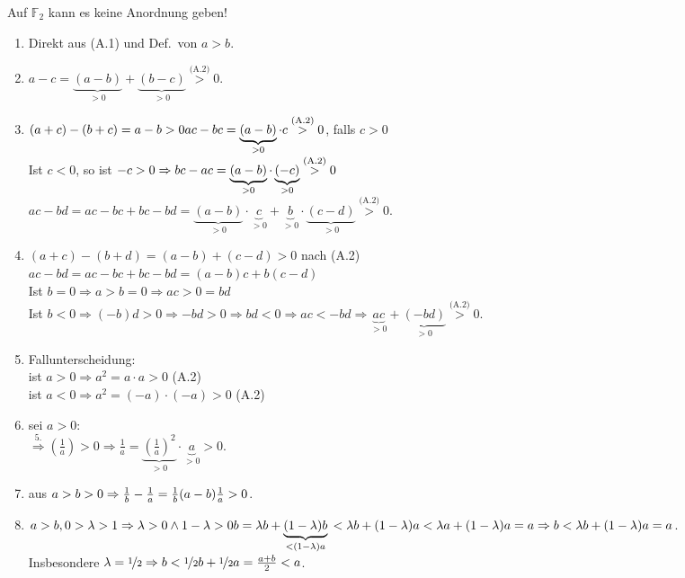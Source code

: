 \documentclass[../ana1.tex]{subfiles}
\begin{document}
\begin{bem}
	Auf \(\mathbb{F}_2\) kann es keine Anordnung geben!
\end{bem}
\begin{bew}
	\begin{enumerate}\leavevmode %
		\item Direkt aus (A.1) und Def.\ von \(a>b\).
		\item \(a-c = \underbrace{(a-b)}_{>0}+\underbrace{(b-c)}_{>0} \overset{\text{(A.2)}}{>} 0\).
		\item \((a+c)-(b+c)=a-b>0\\
			ac-bc=\underbrace{(a-b)}_{>0}\cdot c \overset{\text{(A.2)}}{>}0\), falls \(c>0\) \\
			Ist \(c<0\), so ist \(-c>0\\
			\Rightarrow bc-ac=\underbrace{(a-b)}_{>0}\cdot\underbrace{(-c)}_{>0} \overset{\text{(A.2)}}{>} 0\) \\
			\(ac-bd=ac-bc+bc-bd=\underbrace{(a-b)}_{>0} \cdot \underbrace{c}_{>0} + \underbrace{b}_{>0} \cdot \underbrace{(c-d)}_{>0} \overset{\text{(A.2)}}{>}0\).
		\item \((a+c)-(b+d) = (a-b)+(c-d)>0\) nach (A.2)\\
			\(ac-bd = ac-bc + bc-bd = (a-b)c + b(c-d)\) \\
			Ist \(b=0 \Rightarrow a> b = 0 \Rightarrow ac > 0 = bd\) \\
			Ist \(b<0 \Rightarrow (-b)d > 0 \Rightarrow -bd > 0 \Rightarrow bd < 0 \Rightarrow ac<-bd \Rightarrow \underbrace{ac}_{>0} + \underbrace{(-bd)}_{>0} \overset{\text{(A.2)}}{>} 0\).
		\item  Fallunterscheidung:\\
			ist \(a>0\Rightarrow a^2 = a\cdot a > 0\) (A.2)\\
			ist \(a<0\Rightarrow a^2 = (-a)\cdot(-a) > 0\) (A.2)
		\item sei \(a>0\): \\
			\(\overset{\text{5.}}{\Rightarrow} \left(\frac{1}{a}\right) > 0 \Rightarrow \frac{1}{a} = \underbrace{{\left(\frac{1}{a}\right)}^2}_{>0} \cdot \underbrace{a}_{>0} > 0\).
		\item aus \(a>b>0\\
			\Rightarrow \frac{1}{b} - \frac{1}{a} = \frac{1}{b}(a-b)\frac{1}{a}>0\).
		\item \(a>b, 0>\lambda>1 \Rightarrow \lambda > 0 \wedge 1-\lambda > 0\\
			b=\lambda b + \underbrace{(1-\lambda)b}_{<(1-\lambda)a}\\
			<\lambda b + (1-\lambda) a < \lambda a + (1-\lambda)a = a\\
			\Rightarrow b<\lambda b + (1-\lambda)a =a\).\\
			Insbesondere \(\lambda = \nicefrac{1}{2}\Rightarrow b< \nicefrac{1}{2} b + \nicefrac{1}{2}a = \frac{a+b}{2} < a\).
	\end{enumerate}
\end{bew}
\end{document}
